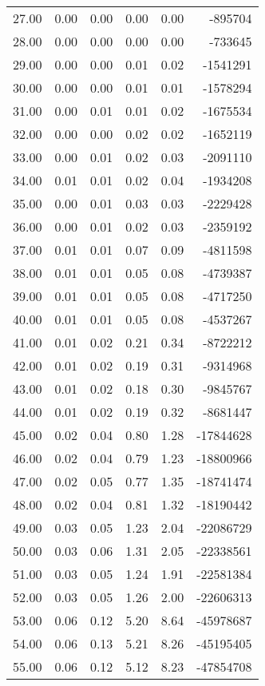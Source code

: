 \begin{table}[ht]
\begin{tabular}{rrrrrr}
  27.00 & 0.00 & 0.00 & 0.00 & 0.00 & -895704 \\ 
  28.00 & 0.00 & 0.00 & 0.00 & 0.00 & -733645 \\ 
  29.00 & 0.00 & 0.00 & 0.01 & 0.02 & -1541291 \\ 
  30.00 & 0.00 & 0.00 & 0.01 & 0.01 & -1578294 \\ 
  31.00 & 0.00 & 0.01 & 0.01 & 0.02 & -1675534 \\ 
  32.00 & 0.00 & 0.00 & 0.02 & 0.02 & -1652119 \\ 
  33.00 & 0.00 & 0.01 & 0.02 & 0.03 & -2091110 \\ 
  34.00 & 0.01 & 0.01 & 0.02 & 0.04 & -1934208 \\ 
  35.00 & 0.00 & 0.01 & 0.03 & 0.03 & -2229428 \\ 
  36.00 & 0.00 & 0.01 & 0.02 & 0.03 & -2359192 \\ 
  37.00 & 0.01 & 0.01 & 0.07 & 0.09 & -4811598 \\ 
  38.00 & 0.01 & 0.01 & 0.05 & 0.08 & -4739387 \\ 
  39.00 & 0.01 & 0.01 & 0.05 & 0.08 & -4717250 \\ 
  40.00 & 0.01 & 0.01 & 0.05 & 0.08 & -4537267 \\ 
  41.00 & 0.01 & 0.02 & 0.21 & 0.34 & -8722212 \\ 
  42.00 & 0.01 & 0.02 & 0.19 & 0.31 & -9314968 \\ 
  43.00 & 0.01 & 0.02 & 0.18 & 0.30 & -9845767 \\ 
  44.00 & 0.01 & 0.02 & 0.19 & 0.32 & -8681447 \\ 
  45.00 & 0.02 & 0.04 & 0.80 & 1.28 & -17844628 \\ 
  46.00 & 0.02 & 0.04 & 0.79 & 1.23 & -18800966 \\ 
  47.00 & 0.02 & 0.05 & 0.77 & 1.35 & -18741474 \\ 
  48.00 & 0.02 & 0.04 & 0.81 & 1.32 & -18190442 \\ 
  49.00 & 0.03 & 0.05 & 1.23 & 2.04 & -22086729 \\ 
  50.00 & 0.03 & 0.06 & 1.31 & 2.05 & -22338561 \\ 
  51.00 & 0.03 & 0.05 & 1.24 & 1.91 & -22581384 \\ 
  52.00 & 0.03 & 0.05 & 1.26 & 2.00 & -22606313 \\ 
  53.00 & 0.06 & 0.12 & 5.20 & 8.64 & -45978687 \\ 
  54.00 & 0.06 & 0.13 & 5.21 & 8.26 & -45195405 \\ 
  55.00 & 0.06 & 0.12 & 5.12 & 8.23 & -47854708 \\ 

\end{tabular}
\end{table}
